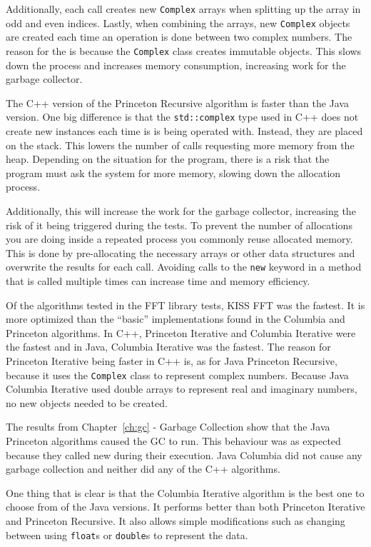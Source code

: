 Additionally, each call creates new \texttt{Complex} arrays when splitting up the array in odd and even indices. Lastly, when combining the arrays, new \texttt{Complex} objects are created each time an operation is done between two complex numbers. The reason for the is because the \texttt{Complex} class creates immutable objects. This slows down the process and increases memory consumption, increasing work for the garbage collector.

The C++ version of the Princeton Recursive algorithm is faster than the Java version. One big difference is that the \texttt{std::complex} type used in C++ does not create new instances each time is is being operated with. Instead, they are placed on the stack. This lowers the number of calls requesting more memory from the heap. Depending on the situation for the program, there is a risk that the program must ask the system for more memory, slowing down the allocation process.

Additionally, this will increase the work for the garbage collector, increasing the risk of it being triggered during the tests. To prevent the number of allocations you are doing inside a repeated process you commonly reuse allocated memory. This is done by pre-allocating the necessary arrays or other data structures and overwrite the results for each call. Avoiding calls to the \texttt{new} keyword in a method that is called multiple times can increase time and memory efficiency.

Of the algorithms tested in the FFT library tests, KISS FFT was the fastest. It is more optimized than the \enquote{basic} implementations found in the Columbia and Princeton algorithms. In C++, Princeton Iterative and Columbia Iterative were the fastest and in Java, Columbia Iterative was the fastest. The reason for Princeton Iterative being faster in C++ is, as for Java Princeton Recursive, because it uses the \texttt{Complex} class to represent complex numbers. Because Java Columbia Iterative used double arrays to represent real and imaginary numbers, no new objects needed to be created.

The results from Chapter~\ref{ch:gc} - Garbage Collection show that the Java Princeton algorithms caused the GC to run. This behaviour was as expected because they called new during their execution. Java Columbia did not cause any garbage collection and neither did any of the C++ algorithms.

One thing that is clear is that the Columbia Iterative algorithm is the best one to choose from of the Java versions. It performs better than both Princeton Iterative and Princeton Recursive. It also allows simple modifications such as changing between using \texttt{float}s or  \texttt{double}s to represent the data.

